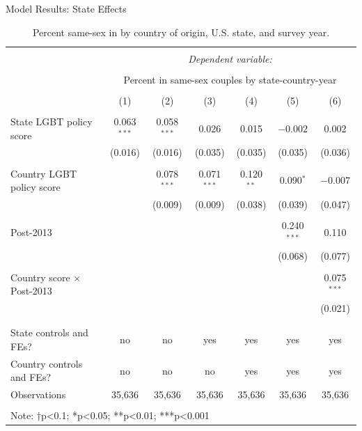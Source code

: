 \documentclass[
  ignorenonframetext,
]{beamer}
\begin{document}
\begin{frame}{Model Results: State Effects}
\protect\hypertarget{model-results-state-effects}{}
\begin{table}[!htbp] \centering 
  \caption{Percent same-sex in by country of origin, U.S. state, and survey year.} 
  \label{tab:state-props} 
\tiny 
\begin{tabular}{@{\extracolsep{3pt}}lcccccc} 
\\[-1.8ex]\hline 
\hline \\[-1.8ex] 
 & \multicolumn{6}{c}{\textit{Dependent variable:}} \\ 
\cline{2-7} 
\\[-1.8ex] & \multicolumn{6}{c}{Percent in same-sex couples by state-country-year} \\ 
\\[-1.8ex] & (1) & (2) & (3) & (4) & (5) & (6)\\ 
\hline \\[-1.8ex] 
 State LGBT policy score & 0.063$^{***}$ & 0.058$^{***}$ & 0.026 & 0.015 & $-$0.002 & 0.002 \\ 
  & (0.016) & (0.016) & (0.035) & (0.035) & (0.035) & (0.036) \\ 
  & & & & & & \\ 
 Country LGBT policy score &  & 0.078$^{***}$ & 0.071$^{***}$ & 0.120$^{**}$ & 0.090$^{*}$ & $-$0.007 \\ 
  &  & (0.009) & (0.009) & (0.038) & (0.039) & (0.047) \\ 
  & & & & & & \\ 
 Post-2013 &  &  &  &  & 0.240$^{***}$ & 0.110 \\ 
  &  &  &  &  & (0.068) & (0.077) \\ 
  & & & & & & \\ 
 Country score × Post-2013 &  &  &  &  &  & 0.075$^{***}$ \\ 
  &  &  &  &  &  & (0.021) \\ 
  & & & & & & \\ 
\hline \\[-1.8ex] 
State controls and FEs? & no & no & yes & yes & yes & yes \\ 
Country controls and FEs? & no & no & no & yes & yes & yes \\ 
Observations & 35,636 & 35,636 & 35,636 & 35,636 & 35,636 & 35,636 \\ 
\hline 
\hline \\[-1.8ex] 
\multicolumn{7}{l}{Note: †p<0.1; *p<0.05; **p<0.01; ***p<0.001} \\ 
\end{tabular} 
\end{table}
\end{frame}
\end{document}

